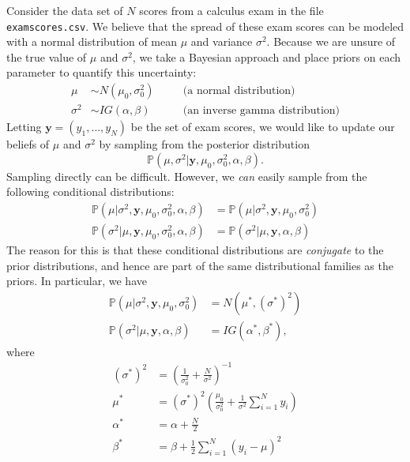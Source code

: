 Consider the data set of $N$ scores from a calculus exam in the file \texttt{examscores.csv}. We believe that the spread of these exam scores can be
modeled with a normal distribution of mean $\mu$ and variance $\sigma^{2}$.
Because we are unsure of the true value of $\mu$ and $\sigma^2$, we take a Bayesian approach and place priors on each parameter to quantify this uncertainty:
\begin{align*}
\mu & \sim N(\mu_{0}, \sigma_{0}^{2})\quad &&\text{(a normal distribution)} \\
\sigma^{2} & \sim IG(\alpha, \beta) &&\text{(an inverse gamma distribution)}
\end{align*}
Letting $\mathbf{y} = (y_1,\ldots,y_N)$ be the set of exam scores, we would like to update our beliefs of $\mu$ and $\sigma^2$ by sampling from the posterior
distribution
\begin{equation*}
\mathbb{P}(\mu, \sigma^{2} | \mathbf{y}, \mu_{0}, \sigma_{0}^{2}, \alpha, \beta).
\end{equation*}
Sampling directly can be difficult. However, we \emph{can} easily sample from the following conditional distributions:
\begin{align*}
\mathbb{P}(\mu | \sigma^{2}, \mathbf{y}, \mu_{0}, \sigma_{0}^{2}, \alpha, \beta) & = \mathbb{P}(\mu | \sigma^{2}, \mathbf{y}, \mu_{0}, \sigma_{0}^{2})\\
\mathbb{P}(\sigma^{2} | \mu, \mathbf{y}, \mu_{0}, \sigma_{0}^{2}, \alpha, \beta) & = \mathbb{P}(\sigma^{2} | \mu, \mathbf{y}, \alpha, \beta)
\end{align*}
The reason for this is that these conditional distributions are \emph{conjugate} to the prior distributions, and hence are part of the same distributional
families as the priors. In particular, we have
\begin{align*}
\mathbb{P}(\mu | \sigma^{2}, \mathbf{y}, \mu_{0}, \sigma_{0}^{2}) &= N(\mu^*, (\sigma^*)^2)\\
\mathbb{P}(\sigma^{2} | \mu, \mathbf{y}, \alpha, \beta) &= IG(\alpha^*, \beta^*),
\end{align*}
where
\begin{align*}
(\sigma^*)^2 &= \left(\frac{1}{\sigma_0^2}+\frac{N}{\sigma^2}\right)^{-1}\\
\mu^* &= (\sigma^*)^2\left(\frac{\mu_0}{\sigma_0^2} + \frac{1}{\sigma^2}\sum_{i=1}^N y_i \right)\\
\alpha^* &= \alpha + \frac{N}{2}\\
\beta^* &= \beta + \frac{1}{2}\sum_{i=1}^N (y_i-\mu)^2
\end{align*}
